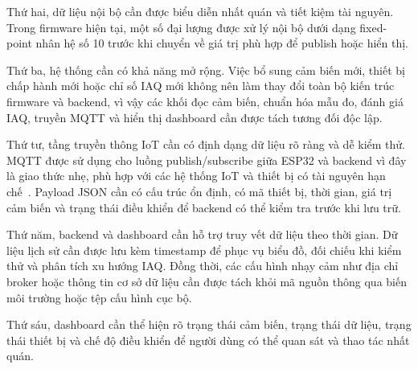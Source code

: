 Thứ hai, dữ liệu nội bộ cần được biểu diễn nhất quán và tiết kiệm tài nguyên. Trong
firmware hiện tại, một số đại lượng được xử lý nội bộ dưới dạng fixed-point nhân hệ số
10 trước khi chuyển về giá trị phù hợp để publish hoặc hiển thị.

Thứ ba, hệ thống cần có khả năng mở rộng. Việc bổ sung cảm biến mới, thiết bị chấp hành
mới hoặc chỉ số IAQ mới không nên làm thay đổi toàn bộ kiến trúc firmware và backend,
vì vậy các khối đọc cảm biến, chuẩn hóa mẫu đo, đánh giá IAQ, truyền MQTT và hiển thị
dashboard cần được tách tương đối độc lập.

Thứ tư, tầng truyền thông IoT cần có định dạng dữ liệu rõ ràng và dễ kiểm thử. MQTT
được sử dụng cho luồng publish/subscribe giữa ESP32 và backend vì đây là giao thức nhẹ,
phù hợp với các hệ thống IoT và thiết bị có tài nguyên hạn chế~\cite{oasismqtt}. Payload
JSON cần có cấu trúc ổn định, có mã thiết bị, thời gian, giá trị cảm biến và trạng thái
điều khiển để backend có thể kiểm tra trước khi lưu trữ.

Thứ năm, backend và dashboard cần hỗ trợ truy vết dữ liệu theo thời gian. Dữ liệu lịch
sử cần được lưu kèm timestamp để phục vụ biểu đồ, đối chiếu khi kiểm thử và phân tích
xu hướng IAQ. Đồng thời, các cấu hình nhạy cảm như địa chỉ broker hoặc thông tin cơ sở
dữ liệu cần được tách khỏi mã nguồn thông qua biến môi trường hoặc tệp cấu hình cục bộ.

Thứ sáu, dashboard cần thể hiện rõ trạng thái cảm biến, trạng thái dữ liệu, trạng thái
thiết bị và chế độ điều khiển để người dùng có thể quan sát và thao tác nhất quán.
